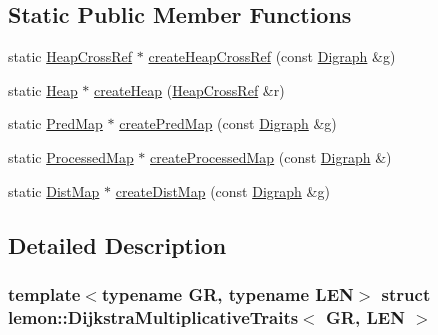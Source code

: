 \subsection*{Static Public Member Functions}
\begin{DoxyCompactItemize}
\item 
static \hyperlink{structlemon_1_1_dijkstra_multiplicative_traits_a6cf2d1691e812bc74967eb6a96bb2110}{Heap\+Cross\+Ref} $\ast$ \hyperlink{structlemon_1_1_dijkstra_multiplicative_traits_aeb8014da9f6368243c538a6a2841d08c}{create\+Heap\+Cross\+Ref} (const \hyperlink{structlemon_1_1_dijkstra_multiplicative_traits_a3ad6d100e3d5d097aaaac8e5733ce3a3}{Digraph} \&g)
\item 
static \hyperlink{structlemon_1_1_dijkstra_multiplicative_traits_ac1f01fa6da75e3af4ca1baabc6be06b8}{Heap} $\ast$ \hyperlink{structlemon_1_1_dijkstra_multiplicative_traits_a395fcb4c11535249168133c009bbf8e4}{create\+Heap} (\hyperlink{structlemon_1_1_dijkstra_multiplicative_traits_a6cf2d1691e812bc74967eb6a96bb2110}{Heap\+Cross\+Ref} \&r)
\item 
static \hyperlink{structlemon_1_1_dijkstra_multiplicative_traits_aa69cc345580a8a6619b0add76aae29e0}{Pred\+Map} $\ast$ \hyperlink{structlemon_1_1_dijkstra_multiplicative_traits_a898d963d49216f0f90870442fbce38d5}{create\+Pred\+Map} (const \hyperlink{structlemon_1_1_dijkstra_multiplicative_traits_a3ad6d100e3d5d097aaaac8e5733ce3a3}{Digraph} \&g)
\item 
static \hyperlink{structlemon_1_1_dijkstra_multiplicative_traits_a48325a83c92b35041eac397cf1728375}{Processed\+Map} $\ast$ \hyperlink{structlemon_1_1_dijkstra_multiplicative_traits_a7ecae716219efe0cafab361a597f90e3}{create\+Processed\+Map} (const \hyperlink{structlemon_1_1_dijkstra_multiplicative_traits_a3ad6d100e3d5d097aaaac8e5733ce3a3}{Digraph} \&)
\item 
static \hyperlink{structlemon_1_1_dijkstra_multiplicative_traits_a2bc3b74c3467b4762e2ac57ea68ef78e}{Dist\+Map} $\ast$ \hyperlink{structlemon_1_1_dijkstra_multiplicative_traits_acd6a683858eba3181c8c51a28b5fa68d}{create\+Dist\+Map} (const \hyperlink{structlemon_1_1_dijkstra_multiplicative_traits_a3ad6d100e3d5d097aaaac8e5733ce3a3}{Digraph} \&g)
\end{DoxyCompactItemize}


\subsection{Detailed Description}
\subsubsection*{template$<$typename GR, typename L\+EN$>$\newline
struct lemon\+::\+Dijkstra\+Multiplicative\+Traits$<$ G\+R, L\+E\+N $>$}

